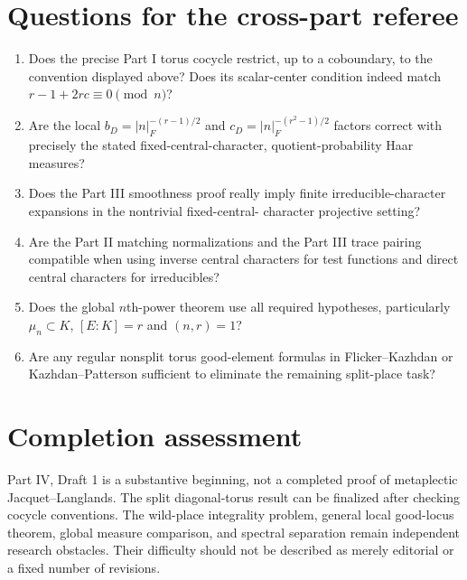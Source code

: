 \documentclass[11pt]{article}
\begin{document}
\section*{Questions for the cross-part referee}
\begin{enumerate}[label=(Q\arabic*)]
\item Does the precise Part I torus cocycle restrict, up to a coboundary,
to the convention displayed above? Does its scalar-center condition
indeed match $r-1+2rc\equiv0\pmod n$?
\item Are the local $b_D=|n|_F^{-(r-1)/2}$ and
$c_D=|n|_F^{-(r^2-1)/2}$ factors correct with precisely the stated
fixed-central-character, quotient-probability Haar measures?
\item Does the Part III smoothness proof really imply finite
irreducible-character expansions in the nontrivial fixed-central-
character projective setting?
\item Are the Part II matching normalizations and the Part III trace
pairing compatible when using inverse central characters for test
functions and direct central characters for irreducibles?
\item Does the global $n$th-power theorem use all required hypotheses,
particularly $\mu_n\subset K$, $[E:K]=r$ and $(n,r)=1$?
\item Are any regular nonsplit torus good-element formulas in
Flicker--Kazhdan or Kazhdan--Patterson sufficient to eliminate the
remaining split-place task?
\end{enumerate}

\section*{Completion assessment}
Part IV, Draft 1 is a substantive beginning, not a completed proof of
metaplectic Jacquet--Langlands. The split diagonal-torus result can
be finalized after checking cocycle conventions. The wild-place
integrality problem, general local good-locus theorem, global measure
comparison, and spectral separation remain independent research
obstacles. Their difficulty should not be described as merely
editorial or a fixed number of revisions.
\end{document}
